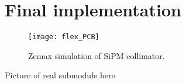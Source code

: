 \section{Final implementation}

\begin{figure}[H]
\texttt{[image: flex\_PCB]}
\caption{Zemax simulation of SiPM collimator.}
\label{fig:sipm_pde}
\end{figure}

Picture of real submodule here